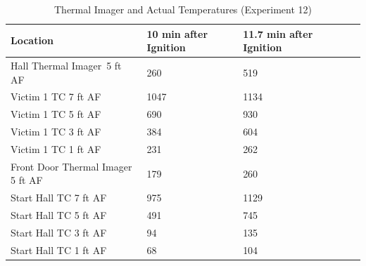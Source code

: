 \documentclass[12pt,oneside]{book}
\begin{document}
\begin{table}[H]
\centering
\begin{tabular}{|L{0.25\textwidth}|C{0.15\textwidth}|C{0.15\textwidth}|C{0.15\textwidth}|C{0.15\textwidth}|}
\hline
Location	                    &10 min after Ignition	&11.7 min after Ignition \\ \hline \hline
Hall Thermal Imager~5 ft AF 	&260	&519	\\ \hline
Victim 1 TC 7 ft AF				&1047	&1134	\\ \hline
Victim 1 TC 5 ft AF				&690	&930	\\ \hline
Victim 1 TC 3 ft AF				&384	&604	\\ \hline
Victim 1 TC 1 ft AF				&231	&262	\\ \hline
Front Door Thermal Imager 5 ft AF &179	&260	\\ \hline
Start Hall TC 7 ft AF			&975	&1129	\\ \hline
Start Hall TC 5 ft AF			&491	&745	\\ \hline
Start Hall TC 3 ft AF			&94		&135	\\ \hline
Start Hall TC 1 ft AF			&68		&104	\\ \hline
\end{tabular}
\caption{Thermal Imager and Actual Temperatures (Experiment 12)}
\label{table:hall_thermal_imager_12}
\end{table}
\end{document}
